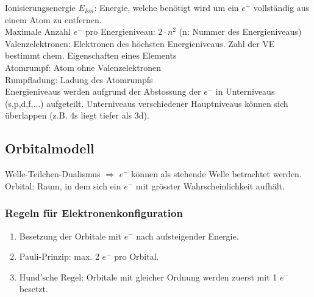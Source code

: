 Ionisierungsenergie $E_{Ion}$: Energie, welche benötigt wird um ein $e^-$ vollständig aus einem Atom zu entfernen.\\

Maximale Anzahl $e^-$ pro Energieniveau: $2 \cdot n^2$ (n: Nummer des Energieniveaus) \\

Valenzelektronen: Elektronen des höchsten Energieniveaus. Zahl der VE bestimmt chem. Eigenschaften eines Elements \\
Atomrumpf: Atom ohne Valenzelektronen \\
Rumpfladung: Ladung des Atomrumpfs \\

Energieniveaus werden aufgrund der Abstossung der $e^-$ in Unterniveaus (s,p,d,f,...) aufgeteilt. Unterniveaus verschiedener Hauptniveaus können sich überlappen (z.B. 4s liegt tiefer als 3d).

\subsection{Orbitalmodell}
Welle-Teilchen-Dualismus $\Rightarrow$ $e^-$ können als stehende Welle betrachtet werden. \\

Orbital: Raum, in dem sich ein $e^-$ mit grösster Wahrscheinlichkeit aufhält. \\

\subsubsection{Regeln für Elektronenkonfiguration}
\begin{enumerate}
	\item Besetzung der Orbitale mit $e^-$ nach aufsteigender Energie.
	\item Pauli-Prinzip: max. 2 $e^-$ pro Orbital.
	\item Hund'sche Regel: Orbitale mit gleicher Ordnung werden zuerst mit 1 $e^-$ besetzt.
\end{enumerate}

